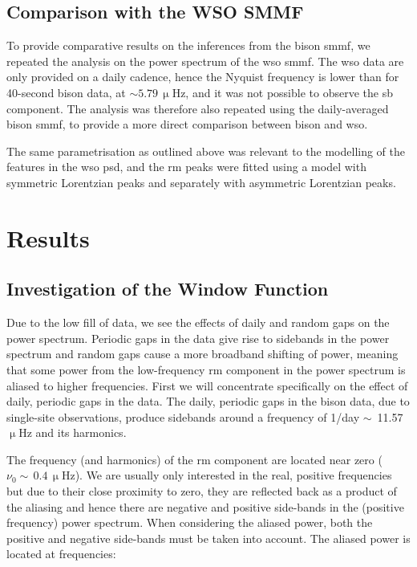 \subsection{Comparison with the WSO SMMF}

To provide comparative results on the inferences from the \gls{bison} \gls{smmf}, we repeated the analysis on the power spectrum of the \gls{wso} \gls{smmf}. The \gls{wso} data are only provided on a daily cadence, hence the Nyquist frequency is lower than for 40-second \gls{bison} data, at $\sim 5.79 \, \upmu\mathrm{Hz}$, and it was not possible to observe the \gls{sb} component. The analysis was therefore also repeated using the daily-averaged \gls{bison} \gls{smmf}, to provide a more direct comparison between \gls{bison} and \gls{wso}.

The same parametrisation as outlined above was relevant to the modelling of the features in the \gls{wso} \gls{psd}, and the \gls{rm} peaks were fitted using a model with symmetric Lorentzian peaks and separately with asymmetric Lorentzian peaks.


\section{Results}\label{sec:SMMF_reults}

\subsection{Investigation of the Window Function}\label{sec:window_fn}


Due to the low fill of data, we see the effects of daily and random gaps on the power spectrum. Periodic gaps in the data give rise to sidebands in the power spectrum and random gaps cause a more broadband shifting of power, meaning that some power from the low-frequency \gls{rm} component in the power spectrum is aliased to higher frequencies. First we will concentrate specifically on the effect of daily, periodic gaps in the data. The daily, periodic gaps in the \gls{bison} data, due to single-site observations, produce sidebands around a frequency of 1/day $\sim$~11.57 $\upmu$Hz and its harmonics.

The frequency (and harmonics) of the \gls{rm} component are located near zero ($\nu_0 \sim \,0.4 \, \upmu\mathrm{Hz}$). We are usually only interested in the real, positive frequencies but due to their close proximity to zero, they are reflected back as a product of the aliasing and hence there are negative and positive side-bands in the (positive frequency) power spectrum. When considering the aliased power, both the positive and negative side-bands must be taken into account. The aliased power is located at frequencies:


